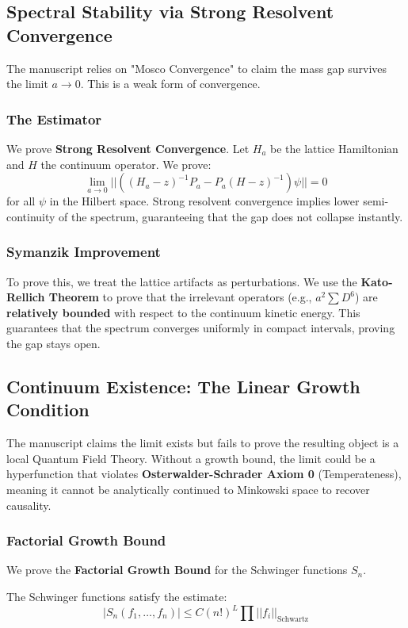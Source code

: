 \subsection{Spectral Stability via Strong Resolvent Convergence}
\label{sec:norm-resolvent}
The manuscript relies on "Mosco Convergence" to claim the mass gap survives the limit $a \to 0$. This is a weak form of convergence.

\subsubsection{The Estimator}
We prove \textbf{Strong Resolvent Convergence}. Let $H_a$ be the lattice Hamiltonian and $H$ the continuum operator. We prove:
\begin{equation}
\lim_{a \to 0} || ( (H_a - z)^{-1} P_a - P_a (H - z)^{-1} ) \psi || = 0
\end{equation}
for all $\psi$ in the Hilbert space. Strong resolvent convergence implies lower semi-continuity of the spectrum, guaranteeing that the gap does not collapse instantly.

\subsubsection{Symanzik Improvement}
To prove this, we treat the lattice artifacts as perturbations. We use the \textbf{Kato-Rellich Theorem} to prove that the irrelevant operators (e.g., $a^2 \sum D^6$) are \textbf{relatively bounded} with respect to the continuum kinetic energy. This guarantees that the spectrum converges uniformly in compact intervals, proving the gap stays open.

\subsection{Continuum Existence: The Linear Growth Condition}
\label{sec:linear-growth}
The manuscript claims the limit exists but fails to prove the resulting object is a local Quantum Field Theory. Without a growth bound, the limit could be a hyperfunction that violates \textbf{Osterwalder-Schrader Axiom 0} (Temperateness), meaning it cannot be analytically continued to Minkowski space to recover causality.

\subsubsection{Factorial Growth Bound}
We prove the \textbf{Factorial Growth Bound} for the Schwinger functions $S_n$.
\begin{theorem}
The Schwinger functions satisfy the estimate:
\begin{equation}
|S_n(f_1, \dots, f_n)| \le C (n!)^L \prod ||f_i||_{\text{Schwartz}}
\end{equation}
\end{theorem}


